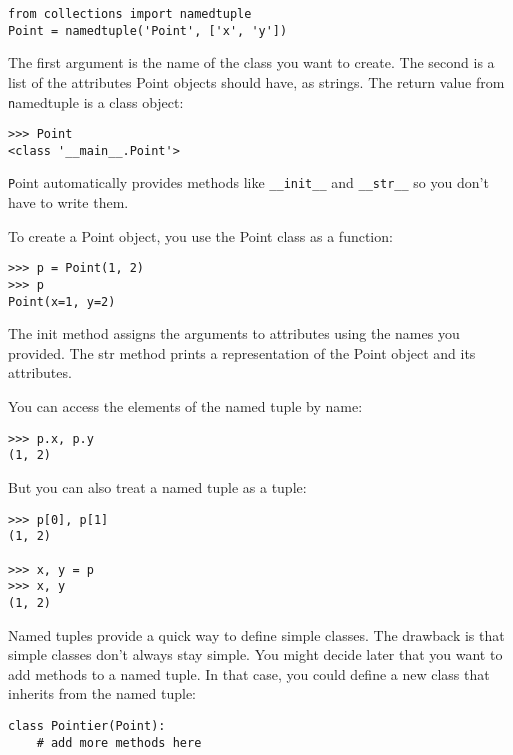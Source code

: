 \documentclass[
DIV=11,
fontsize=13,
twoside,
headinclude=false,
titlepage=firstiscover,
abstract=true,
headsepline=true,
footsepline=true,
chapterprefix=true, %
headings=big,
bibliography=totoc,%
captions=tableheading
]{scrbook}
\theoremstyle{definition}
\begin{document}
\begin{lstlisting}
from collections import namedtuple
Point = namedtuple('Point', ['x', 'y'])
\end{lstlisting}

The first argument is the name of the class you want to create.
The second is a list of the attributes Point objects should have,
as strings.  The return value from {\texttt namedtuple} is a class object:

\begin{lstlisting}
>>> Point
<class '__main__.Point'>
\end{lstlisting}

{\texttt Point} automatically provides methods like \verb"__init__" and
\verb"__str__" so you don't have to write them.

To create a Point object, you use the Point class as a function:

\begin{lstlisting}
>>> p = Point(1, 2)
>>> p
Point(x=1, y=2)
\end{lstlisting}

The init method assigns the arguments to attributes using the names
you provided.  The str method prints a representation of the Point
object and its attributes.

You can access the elements of the named tuple by name:

\begin{lstlisting}
>>> p.x, p.y
(1, 2)
\end{lstlisting}

But you can also treat a named tuple as a tuple:

\begin{lstlisting}
>>> p[0], p[1]
(1, 2)

>>> x, y = p
>>> x, y
(1, 2)
\end{lstlisting}

Named tuples provide a quick way to define simple classes.
The drawback is that simple classes don't always stay simple.
You might decide later that you want to add methods to a named tuple.
In that case, you could define a new class that inherits from
the named tuple:

\begin{lstlisting}
class Pointier(Point):
    # add more methods here
\end{lstlisting}
\end{document}
